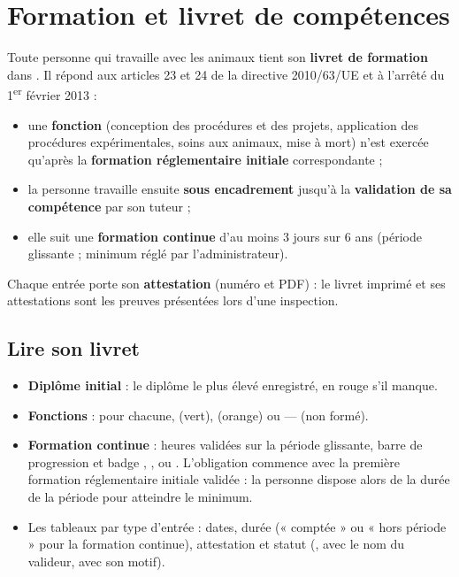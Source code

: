 \documentclass[11pt,a4paper]{article}
\begin{document}
\section{Formation et livret de compétences}\label{sec:livret}
Toute personne qui travaille avec les animaux tient son \textbf{livret de
formation} dans . Il répond aux
articles 23 et 24 de la directive 2010/63/UE et à l'arrêté du 1\textsuperscript{er}
février 2013 :
\begin{itemize}
  \item une \textbf{fonction} (conception des procédures et des projets,
    application des procédures expérimentales, soins aux animaux, mise à mort)
    n'est exercée qu'après la \textbf{formation réglementaire initiale}
    correspondante ;
  \item la personne travaille ensuite \textbf{sous encadrement} jusqu'à la
    \textbf{validation de sa compétence} par son tuteur ;
  \item elle suit une \textbf{formation continue} d'au moins 3 jours sur
    6 ans (période glissante ; minimum réglé par l'administrateur).
\end{itemize}
Chaque entrée porte son \textbf{attestation} (numéro et PDF) : le livret
imprimé et ses attestations sont les preuves présentées lors d'une
inspection.


\subsection{Lire son livret}
\begin{itemize}
  \item \textbf{Diplôme initial} : le diplôme le plus élevé enregistré, en
    rouge s'il manque.
  \item \textbf{Fonctions} : pour chacune, 
    (vert),  (orange) ou --- (non formé).
  \item \textbf{Formation continue} : heures validées sur la période
    glissante, barre de progression et badge ,
    ,  ou
    . L'obligation commence avec la première
    formation réglementaire initiale validée : la personne dispose alors de
    la durée de la période pour atteindre le minimum.
  \item Les tableaux par type d'entrée : dates, durée (« comptée » ou « hors
    période » pour la formation continue), attestation et statut
    (,  avec le nom du valideur, 
    avec son motif).
\end{itemize}
\end{document}
